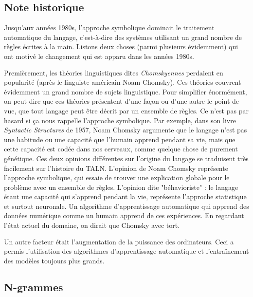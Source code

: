 \documentclass[11pt, a4paper]{report}
\begin{document}
  \subsection{Note historique}
  Jusqu'aux années 1980s, l'approche symbolique dominait le traitement automatique du langage, 
  c'est-à-dire des systèmes utilisant un grand nombre de règles écrites à la main. Listons deux
  choses (parmi plusieurs évidemment) qui ont motivé le changement qui est apparu dans les années 
  1980s. 

  Premièrement, les théories linguistiques dites \textit{Chomskyennes} perdaient en popularité
  (après le linguiste américain Noam Chomsky). Ces théories couvrent évidemment un grand nombre 
  de sujets linguistique. Pour simplifier énormément, on peut dire que ces théories 
  présentent d'une façon ou d'une autre le point de vue, que tout langage peut être décrit par 
  un ensemble de règles. Ce n'est pas par hasard si ça nous rappelle l'approche symbolique. 
  Par exemple, dans son livre \textit{Syntactic Structures} de 1957, Noam Chomsky argumente 
  que le langage n'est pas une habitude ou une capacité que l'humain apprend pendant sa vie, 
  mais que cette capacité est codée dans nos cerveaux, comme quelque chose de purement génétique.
  Ces deux opinions différentes sur l'origine du langage se traduisent très facilement sur l'histoire 
  du TALN. L'opinion de Noam Chomsky représente l'approche symbolique, qui essaie de trouver une 
  explication globale pour le problème avec un ensemble de règles. L'opinion dite "béhavioriste" : 
  le langage étant une capacité qui s'apprend pendant la vie, représente l'approche statistique 
  et surtout neuronale. Un algorithme d'apprentissage automatique qui apprend des données 
  numérique comme un humain apprend de ces expériences. En regardant l'état actuel du domaine, 
  on dirait que Chomsky avec tort. 
  
  Un autre facteur était l'augmentation de la puissance des ordinateurs. Ceci a permis l'utilisation 
  des algorithmes d'apprentissage automatique et l'entraînement des modèles toujours plus grands. 

  \subsection{N-grammes}
  \cite{stanford-book-ngrams}
\end{document}
